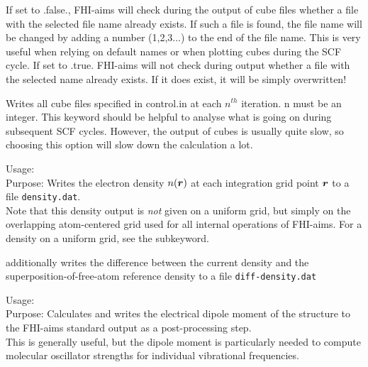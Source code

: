   \noindent


If set to .false., FHI-aims will check during the output of cube files whether a file with the selected 
file name already exists. If such a file is found, the file name will be changed by adding a number (1,2,3...) to the end of the file name. This is very useful when relying on default names or when plotting cubes during the SCF cycle.
If set to .true. FHI-aims will not check during output whether a file with the selected name already exists. If it does exist, it will be simply overwritten! 


  \noindent
Writes all cube files specified in control.in at each $n^{th}$ iteration. n must be an integer. This keyword should be helpful to analyse what is going on during subsequent SCF cycles. However, the output of cubes is usually quite slow, so choosing this option will slow down the calculation a lot.
    
{
  \noindent
  Usage:   \\[1.0ex]
  Purpose: Writes the electron density $n(\mbox{\boldmath$r$})$
    at each integration grid point $\mbox{\boldmath$r$}$ to a file
  \texttt{density.dat}. \\[1.0ex]
}
Note that this density output is \emph{not} given on a uniform grid,
but simply on the overlapping atom-centered grid used for all internal
operations of FHI-aims. For a density on a uniform grid, see the
  subkeyword. 

  additionally writes the
difference between the current density and the
superposition-of-free-atom reference density to a file \texttt{diff-density.dat}

{
  \noindent
  Usage:   \\[1.0ex]
  Purpose: Calculates and writes the electrical dipole moment of the
    structure to the FHI-aims standard output as a post-processing step. \\[1.0ex]
}
This is generally useful, but the dipole moment is particularly needed
to compute molecular oscillator strengths for individual vibrational
frequencies. 

